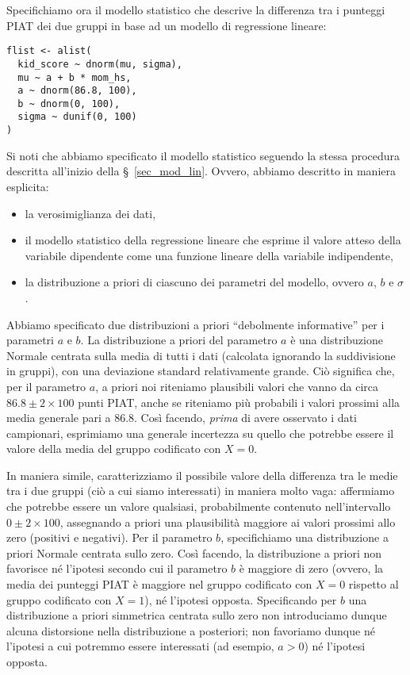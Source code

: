 Specifichiamo ora il modello statistico che descrive la differenza tra i punteggi PIAT dei due gruppi in base ad un modello di regressione lineare:




\begin{lstlisting}
flist <- alist(
  kid_score ~ dnorm(mu, sigma),
  mu ~ a + b * mom_hs,
  a ~ dnorm(86.8, 100),
  b ~ dnorm(0, 100),
  sigma ~ dunif(0, 100)
)
\end{lstlisting}
 


Si noti che abbiamo specificato il modello statistico seguendo la stessa procedura descritta all'inizio della \S~\ref{sec_mod_lin}.
Ovvero, abbiamo descritto in maniera esplicita:
\begin{itemize}
\item la verosimiglianza dei dati,
\item il modello statistico della regressione lineare che esprime il valore atteso della variabile dipendente come una funzione lineare della variabile indipendente,
\item la distribuzione a priori di ciascuno dei parametri del modello, ovvero $a$, $b$ e $\sigma$.
\end{itemize}

Abbiamo specificato due distribuzioni a priori \enquote{debolmente informative} per i parametri $a$ e $b$.
La distribuzione a priori del parametro $a$ è una distribuzione Normale centrata sulla media di tutti i dati (calcolata ignorando la suddivisione in gruppi), con una deviazione standard relativamente grande. 
Ciò significa che, per il parametro $a$, a priori noi riteniamo plausibili valori che vanno da circa $86.8 \pm 2 \times 100$ punti PIAT, anche se riteniamo più probabili i valori prossimi alla media generale pari a 86.8.
Così facendo, \emph{prima} di avere osservato i dati campionari, esprimiamo una generale incertezza su quello che potrebbe essere il valore della media del gruppo codificato con $X = 0$.

In maniera simile, caratterizziamo il possibile valore della differenza tra le medie tra i due gruppi (ciò a cui siamo interessati) in maniera molto vaga: affermiamo che potrebbe essere un valore qualsiasi, probabilmente contenuto nell'intervallo $0 \pm 2 \times 100$, assegnando a priori una plausibilità maggiore ai valori prossimi allo zero (positivi e negativi).
Per il parametro $b$, specifichiamo una distribuzione a priori Normale centrata sullo zero.
Così facendo, la distribuzione a priori non favorisce né l'ipotesi secondo cui il parametro $b$ è maggiore di zero (ovvero, la media dei punteggi PIAT è maggiore nel gruppo codificato con $X = 0$ rispetto al gruppo codificato con $X = 1$), né  l'ipotesi opposta.
Specificando per $b$ una distribuzione a priori simmetrica centrata sullo zero non introduciamo dunque alcuna distorsione nella distribuzione a posteriori; non favoriamo dunque né l'ipotesi a cui potremmo essere interessati (ad esempio, $a > 0$) né l'ipotesi opposta.

